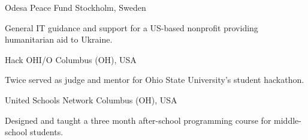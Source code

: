 

\begin{cventries}

  \cventryshort
    {Odesa Peace Fund} %
    {Stockholm, Sweden} %
    {
      \begin{cvitems} %
        \item {General IT guidance and support for a US-based nonprofit providing humanitarian aid to Ukraine.}
      \end{cvitems}
    }

  \cventryshort
    {Hack OHI/O} %
    {Columbus (OH), USA} %
    {
      \begin{cvitems} %
        \item {Twice served as judge and mentor for Ohio State University's student hackathon.}
      \end{cvitems}
    }

  \cventryshort
    {United Schools Network} %
    {Columbus (OH), USA} %
    {
      \begin{cvitems} %
        \item {Designed and taught a three month after-school programming course for middle-school students.}
      \end{cvitems}
    }

\end{cventries}
